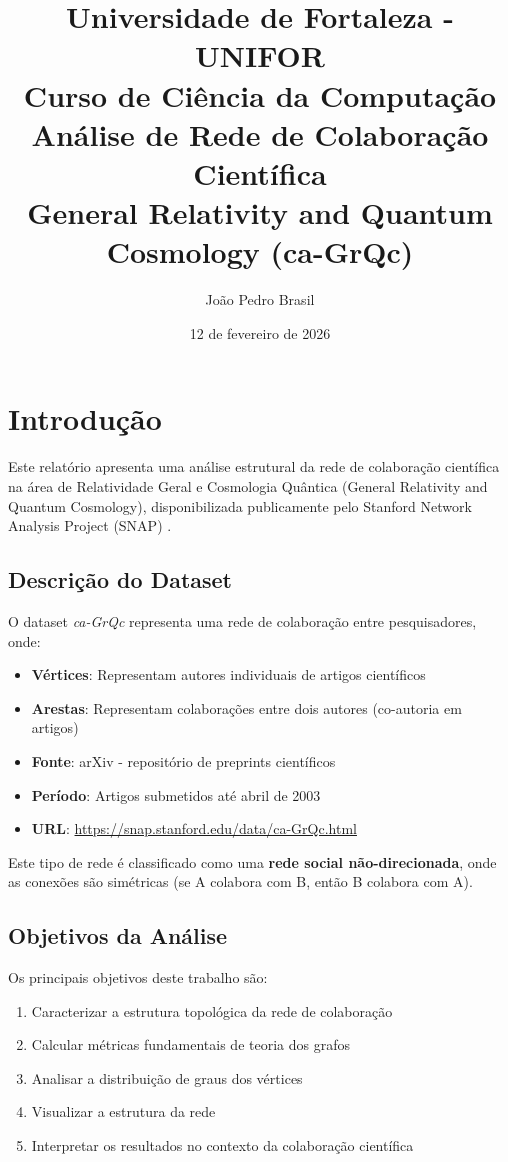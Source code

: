 \documentclass[12pt,a4paper]{article}
\title{
    \Large\textbf{Universidade de Fortaleza - UNIFOR}\\
    \large Curso de Ciência da Computação\\
    \vspace{1.5cm}
    \huge\textbf{Análise de Rede de Colaboração Científica}\\
    \large General Relativity and Quantum Cosmology (ca-GrQc)
}
\author{João Pedro Brasil}
\date{12 de fevereiro de 2026}
\begin{document}
\maketitle
\thispagestyle{empty}
\newpage

\tableofcontents
\newpage

\section{Introdução}

Este relatório apresenta uma análise estrutural da rede de colaboração científica na área de Relatividade Geral e Cosmologia Quântica (General Relativity and Quantum Cosmology), disponibilizada publicamente pelo Stanford Network Analysis Project (SNAP) \cite{snapnets}.

\subsection{Descrição do Dataset}

O dataset \textit{ca-GrQc} representa uma rede de colaboração entre pesquisadores, onde:

\begin{itemize}
    \item \textbf{Vértices}: Representam autores individuais de artigos científicos
    \item \textbf{Arestas}: Representam colaborações entre dois autores (co-autoria em artigos)
    \item \textbf{Fonte}: arXiv - repositório de preprints científicos
    \item \textbf{Período}: Artigos submetidos até abril de 2003
    \item \textbf{URL}: \url{https://snap.stanford.edu/data/ca-GrQc.html}
\end{itemize}

Este tipo de rede é classificado como uma \textbf{rede social não-direcionada}, onde as conexões são simétricas (se A colabora com B, então B colabora com A).

\subsection{Objetivos da Análise}

Os principais objetivos deste trabalho são:

\begin{enumerate}
    \item Caracterizar a estrutura topológica da rede de colaboração
    \item Calcular métricas fundamentais de teoria dos grafos
    \item Analisar a distribuição de graus dos vértices
    \item Visualizar a estrutura da rede
    \item Interpretar os resultados no contexto da colaboração científica
\end{enumerate}
\end{document}
